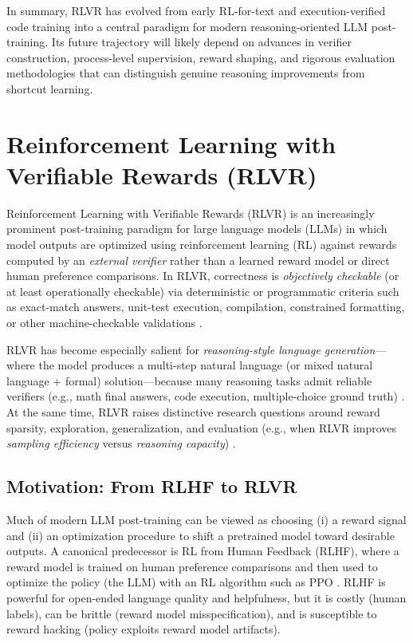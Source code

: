 \documentclass[sigconf]{acmart}
\begin{document}
In summary, RLVR has evolved from early RL-for-text and execution-verified code training into a central paradigm for modern reasoning-oriented LLM post-training. Its future trajectory will likely depend on advances in verifier construction, process-level supervision, reward shaping, and rigorous evaluation methodologies that can distinguish genuine reasoning improvements from shortcut learning.


\section{Reinforcement Learning with Verifiable Rewards (RLVR)}
\label{sec:rlvr}

Reinforcement Learning with Verifiable Rewards (RLVR) is an increasingly prominent post-training paradigm for large language models (LLMs) in which model outputs are optimized using reinforcement learning (RL) against rewards computed by an \emph{external verifier} rather than a learned reward model or direct human preference comparisons.
In RLVR, correctness is \emph{objectively checkable} (or at least operationally checkable) via deterministic or programmatic criteria such as exact-match answers, unit-test execution, compilation, constrained formatting, or other machine-checkable validations \cite{guo2025deepseekr1,deepseekai2024deepseekmath,wen2025rlvr}.

RLVR has become especially salient for \emph{reasoning-style language generation}---where the model produces a multi-step natural language (or mixed natural language + formal) solution---because many reasoning tasks admit reliable verifiers (e.g., math final answers, code execution, multiple-choice ground truth) \cite{guo2025deepseekr1,wen2025rlvr,zhang2025medrlvr}.
At the same time, RLVR raises distinctive research questions around reward sparsity, exploration, generalization, and evaluation (e.g., when RLVR improves \emph{sampling efficiency} versus \emph{reasoning capacity}) \cite{wen2025rlvr,mroueh2025grpo}.

\subsection{Motivation: From RLHF to RLVR}

Much of modern LLM post-training can be viewed as choosing (i) a reward signal and (ii) an optimization procedure to shift a pretrained model toward desirable outputs.
A canonical predecessor is RL from Human Feedback (RLHF), where a reward model is trained on human preference comparisons and then used to optimize the policy (the LLM) with an RL algorithm such as PPO \cite{christiano2017preferences,ziegler2019finetuning,stiennon2020summarize,ouyang2022instructgpt,schulman2017ppo}.
RLHF is powerful for open-ended language quality and helpfulness, but it is costly (human labels), can be brittle (reward model misspecification), and is susceptible to reward hacking (policy exploits reward model artifacts).
\end{document}
